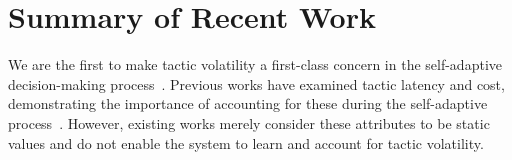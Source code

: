 \section{Summary of Recent Work}\vspace{-2mm}

We are the first to make tactic volatility a first-class concern in the self-adaptive decision-making process~\cite{Krutz_ase_2019}. Previous works have examined tactic latency and cost, demonstrating the importance of accounting for these during the self-adaptive process~\cite{Moreno:2018:FED:3208359.3149180, 7573126, moreno2017adaptation, moreno2015proactive, Jung:2009:CAE:1813355.1813367}. However, existing works merely consider these attributes to be static values and do not enable the system to learn and account for tactic volatility.  










